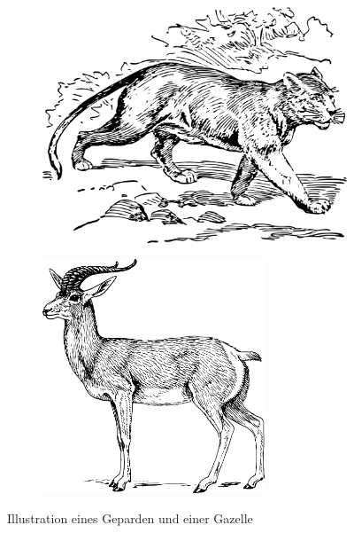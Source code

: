         \begin{figure}[htbp]
            \begin{subfigure}{0.5\textwidth}
                \includegraphics[width = 1\textwidth, left]{../pictures/cheetah.png}
            \end{subfigure}
            \begin{subfigure}{0.5\textwidth}
                \includegraphics[width = 0.73\textwidth, right]{../pictures/gazelle.png}
            \end{subfigure}
            \caption{Illustration eines Geparden und einer Gazelle \label{fig:gazelleAndGepard}}
        \end{figure}
